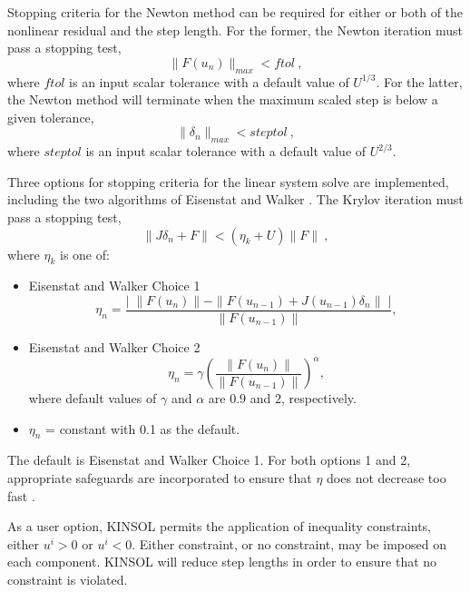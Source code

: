 Stopping criteria for the Newton method can be required for either or 
both of the nonlinear residual and the step length.  For the former, 
the Newton iteration must pass a stopping test,
\[ \|F(u_n)\|_{max} < ftol ~, \]
where $ftol$ is an input scalar tolerance with a default value of $U^{1/3}$.
For the latter, the Newton method will terminate when the maximum scaled step
is below a given tolerance,
\[ \|\delta_n\|_{max} < steptol ~, \]
where $steptol$ is an input scalar tolerance with a default value of 
$U^{2/3}$.

Three options for stopping criteria for the linear system solve are
implemented, including the two 
algorithms of Eisenstat and Walker \cite{EiWa:96}.
The Krylov iteration must pass a stopping test,
\[ \|J \delta_n + F\| < (\eta_k + U) \|F\| ~, \]
where $\eta_k$ is one of:
\begin{itemize}
\item Eisenstat and Walker Choice 1
\[ \eta_n = \frac{\left|\; \|F(u_n)\|  
                           - \|F(u_{n-1}) + J(u_{n-1}) \delta_n \| 
                  \; \right|}
               {\|F(u_{n-1})\|},  \]
\item Eisenstat and Walker Choice 2
\[ \eta_n = \gamma \left( \frac{ \|F(u_n)\|}{\|F(u_{n-1})\|} \right)^{\alpha},
\] where default values of $\gamma$ and $\alpha$ are $0.9$ and $2$, 
respectively. 
\item  $\eta_n$ = constant with 0.1 as the default.
\end{itemize}
The default is Eisenstat and Walker Choice 1.  
For both options 1 and 2, appropriate 
safeguards are incorporated to ensure that $\eta$ does not decrease 
too fast \cite{EiWa:96}.

As a user option, KINSOL permits the application of inequality
constraints, either $u^i > 0$ or $u^i < 0$.  Either constraint, or
no constraint, may be imposed on each component.  KINSOL will reduce 
step lengths in order to ensure that no constraint is violated.


